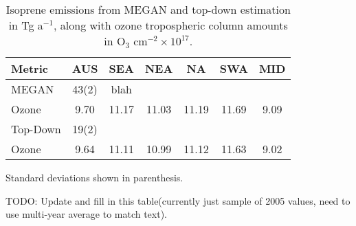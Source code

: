   \begin{table}\begin{threeparttable}
    \caption{Isoprene emissions from MEGAN and top-down estimation in Tg a$^{-1}$, along with ozone tropospheric column amounts in O$_3$ cm$^{-2} \times 10^{17}$.}
    \begin{tabular}{ l c c c c c c } 
      \toprule
      Metric & AUS & SEA & NEA & NA & SWA & MID \\
      \midrule
      MEGAN & 43(2) & blah &  &  & & \\
      Ozone & 9.70 & 11.17 & 11.03 & 11.19 & 11.69 & 9.09 \\
      \midrule
      Top-Down & 19(2) & & & & & \\
      Ozone & 9.64 & 11.11 & 10.99 & 11.12 & 11.63 & 9.02 \\
      \bottomrule
    \end{tabular}
    \begin{tablenotes}
      \item Standard deviations shown in parenthesis.
      \item TODO: Update and fill in this table(currently just sample of 2005 values, need to use multi-year average to match text).
    \end{tablenotes}
    \label{Conclusions:ozone:tab_emissions_vs_ozone}
  \end{threeparttable}\end{table}
  
  
